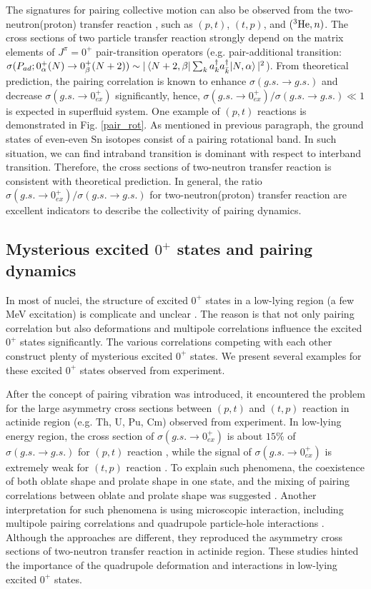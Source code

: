 \documentclass[11pt]{book} %
\begin{document}
The signatures for pairing collective motion can also be observed from the two-neutron(proton) transfer reaction \cite{BHR73}, such as $(p, t)$, $(t, p)$, and $({}^3{\rm He}, n)$. The cross sections of two particle transfer reaction strongly depend on the matrix elements of $J^{\pi}=0^+$ pair-transition operators (e.g. pair-additional transition: $\sigma( P_{ad};0_{\alpha}^+(N) \to 0_{\beta}^+(N+2))\sim |\braket{N+2,\beta|\sum_k a^{\dag}_k a^{\dag}_{\bar{k}}|N,\alpha}|^2$). From theoretical prediction, the pairing correlation is known to enhance $\sigma(g.s.\to g.s.)$ and decrease $\sigma(g.s.\to 0_{ex}^+)$ significantly, hence, $\sigma(g.s.\to 0_{ex}^+)/\sigma(g.s.\to g.s.)\ll 1$ is expected in superfluid system. One example of $(p, t)$ reactions is demonstrated in Fig. \ref{pair_rot}. As mentioned in previous paragraph, the ground states of even-even Sn isotopes consist of a pairing rotational band. In such situation, we can find intraband transition is dominant with respect to interband transition. Therefore, the cross sections of two-neutron transfer reaction is consistent with theoretical prediction. In general, the ratio $\sigma(g.s.\to 0_{ex}^+)/\sigma(g.s.\to g.s.)$ for two-neutron(proton) transfer reaction are excellent indicators to describe the collectivity of pairing dynamics.

\subsection{Mysterious excited $0^+$ states and pairing dynamics}
In most of nuclei, the structure of excited $0^+$ states in a low-lying region (a few MeV excitation) is complicate and unclear \cite{HW11}. The reason is that not only pairing correlation but also deformations and multipole correlations influence the excited $0^+$ states significantly. The various correlations competing with each other construct plenty of mysterious excited $0^+$ states. We present several examples for these excited $0^+$ states observed from experiment.

After the concept of pairing vibration was introduced, it encountered the problem for the large asymmetry cross sections between $(p, t)$ and $(t, p)$ reaction in actinide region (e.g. Th, U, Pu, Cm) observed from experiment. In low-lying energy region, the cross section of $\sigma(g.s.\to 0_{ex}^+)$ is about $15\%$ of $\sigma(g.s.\to g.s.)$ for $(p, t)$ reaction \cite{MEFSS70, MEFSS72}, while the signal of $\sigma(g.s.\to 0_{ex}^+)$ is extremely weak for $(t, p)$ reaction \cite{Cas72}. To explain such phenomena, the coexistence of both oblate shape and prolate shape in one state, and the mixing of pairing correlations between oblate and prolate shape was suggested \cite{GJV71,RK72}. Another interpretation for such phenomena is using microscopic interaction, including multipole pairing correlations and quadrupole particle-hole interactions \cite{RB76}. Although the approaches are different, they reproduced the asymmetry cross sections of two-neutron transfer reaction in actinide region. These studies hinted the importance of the quadrupole deformation and interactions in low-lying excited $0^+$ states. 
\end{document}
